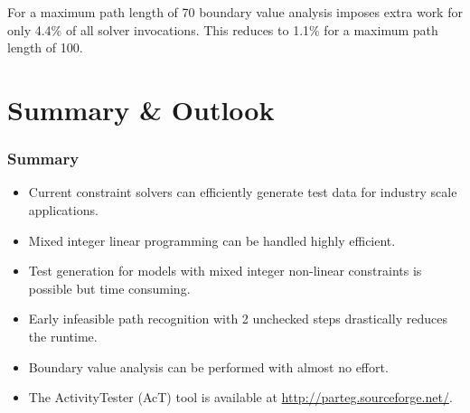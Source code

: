 \documentclass{beamer}
\begin{document}
\begin{frame}
%
\begin{block}{}
For a maximum path length of 70 boundary value analysis imposes extra work for
only 4.4\% of all solver invocations. This reduces to 1.1\% for a maximum path
length of 100.
\end{block}
\end{frame}

\section{Summary \& Outlook}

\begin{frame}
\frametitle{Summary}
\begin{itemize}
  \item Current constraint solvers can efficiently generate test data for
  industry scale applications.
  \item Mixed integer linear programming can be handled highly efficient.
  \item Test generation for models with mixed integer non-linear constraints is
  possible but time consuming.
  \item Early infeasible path recognition with 2 unchecked steps drastically
  reduces the runtime.
  \item Boundary value analysis can be performed with almost no effort.
  \item The ActivityTester (AcT) tool is available at
  \href{http://parteg.sourceforge.net/}{http://parteg.sourceforge.net/}.
\end{itemize}
\end{frame}
\end{document}

